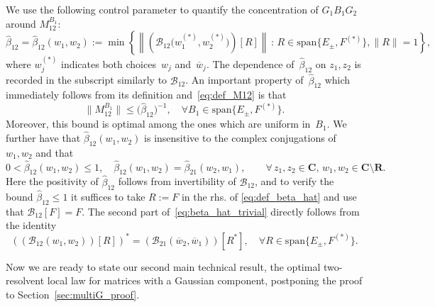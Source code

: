 \documentclass[10pt]{amsart}
\numberwithin{equation}{section}
\newcommand{\R}{\mathbf{R}}
\newcommand{\C}{\mathbf{C}}
\begin{document}
We use the following control parameter to quantify the concentration of $G_1B_1G_2$ around $M_{12}^{B_1}$: 
\begin{equation}
\widehat{\beta}_{12}=\widehat{\beta}_{12}(w_1,w_2):=\min\left\lbrace \left\lVert \left(\mathcal{B}_{12}\big(w_1^{(*)},w_2^{(*)}\big)\right)[R]\right\rVert \,:\,R\in \mathrm{span}\{E_\pm,F^{(*)}\}, \|R\|=1\right\rbrace,
\label{eq:def_beta_hat}
\end{equation}
where $w_j^{(*)}$ indicates both choices~$w_j$ and~$\overline{w}_j$. The dependence of~$\widehat{\beta}_{12}$ on $z_1,z_2$ is recorded in the subscript similarly to $\mathcal{B}_{12}$. An important property of~$\widehat{\beta}_{12}$ which immediately follows from its definition and~\eqref{eq:def_M12} is that
\begin{equation}
\|M_{12}^{B_1}\|\le \big(\widehat{\beta}_{12}\big)^{-1},\quad\forall B_1\in \mathrm{span}\{E_\pm,F^{(*)}\}.
\label{eq:M_12_beta_bound}
\end{equation}
Moreover, this bound is optimal among the ones which are uniform in~$B_1$. We further have that $\widehat{\beta}_{12}(w_1,w_2)$ is insensitive to the complex conjugations of $w_1, w_2$ and that
\begin{equation}
0<\widehat{\beta}_{12}(w_1,w_2)\le 1,\quad \widehat{\beta}_{12}(w_1,w_2)=\widehat{\beta}_{21}(w_2,w_1),\qquad \forall \, z_1,z_2\in\C,\, w_1,w_2\in\C\setminus\R.
\label{eq:beta_hat_trivial}
\end{equation}
Here the positivity of $\widehat{\beta}_{12}$ follows from invertibility of $\mathcal{B}_{12}$, and to verify the bound $\widehat{\beta}_{12}\le 1$ it suffices to take $R:=F$ in the rhs. of \eqref{eq:def_beta_hat} and use that $\mathcal{B}_{12}[F]=F$. The second part of~\eqref{eq:beta_hat_trivial} directly follows from the identity
\begin{equation}
\left(\left(\mathcal{B}_{12}(w_1,w_2)\right)[R]\right)^* = \left(\mathcal{B}_{21}(\overline{w}_2,\overline{w}_1)\right)[R^*],\quad \forall R\in \mathrm{span}\{E_\pm,F^{(*)}\}.
\end{equation}

Now we are ready to state our second main technical result, the optimal two-resolvent local law for matrices with a Gaussian component, postponing the proof to Section~\ref{sec:multiG_proof}.
\end{document}
